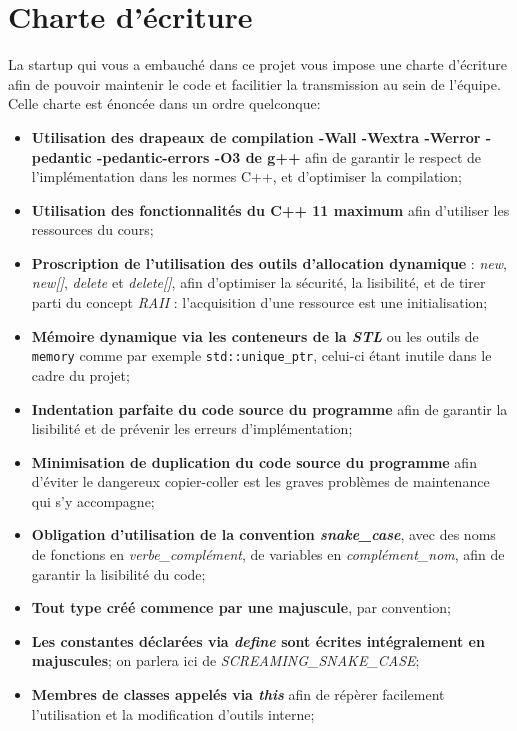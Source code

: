 \documentclass[9pts]{article}
\begin{document}
\section{Charte d'écriture}
\label{sec::charte}
La startup qui vous a embauché dans ce projet vous impose une charte d'écriture afin de pouvoir maintenir le code et facilitier la transmission au sein de l'équipe. Celle charte est énoncée dans un ordre quelconque:\\

\begin{itemize}
\item \textbf{Utilisation des drapeaux de compilation -Wall -Wextra -Werror -pedantic -pedantic-errors -O3 de g++} afin de garantir le respect de l'implémentation dans les normes C++, et d'optimiser la compilation;
\item \textbf{Utilisation des fonctionnalités du C++ 11 maximum} afin d'utiliser les ressources du cours; %
\item \textbf{Proscription de l'utilisation des outils d'allocation dynamique} : \emph{new}, \emph{new[]}, \emph{delete} et \emph{delete[]}, afin d'optimiser la sécurité, la lisibilité, et de tirer parti du concept \emph{RAII} : l'acquisition d'une ressource est une initialisation;
\item \textbf{Mémoire dynamique via les conteneurs de la \emph{STL}} ou les outils de \texttt{memory} comme par exemple \texttt{std::unique\_ptr}, celui-ci étant inutile dans le cadre du projet;
\item \textbf{Indentation parfaite du code source du programme} afin de garantir la lisibilité et de prévenir les erreurs d'implémentation;
\item \textbf{Minimisation de duplication du code source du programme} afin d'éviter le dangereux copier-coller est les graves problèmes de maintenance qui s'y accompagne;
\item \textbf{Obligation d'utilisation de la convention \emph{snake\_case}}, avec des noms de fonctions en \emph{verbe\_complément}, de variables en \emph{complément\_nom}, afin de garantir la lisibilité du code;
\item \textbf{Tout type créé commence par une majuscule}, par convention;
\item \textbf{Les constantes déclarées via \emph{define} sont écrites intégralement en majuscules}; on parlera ici de \emph{SCREAMING\_SNAKE\_CASE};
\item \textbf{Membres de classes appelés via \emph{this}} afin de répèrer facilement l'utilisation et la modification d'outils interne;

\end{itemize}
\end{document}
